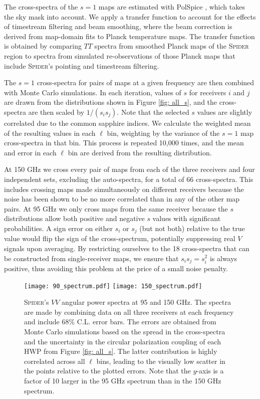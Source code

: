 \documentclass[twocolumn]{aastex61}
\begin{document}
The cross-spectra of the $s=1$ maps are estimated with PolSpice \citep{PolSpice}, which takes the sky mask into account.  We apply a transfer function to account for the effects of timestream filtering and beam smoothing, where the beam correction is derived from map-domain fits to Planck temperature maps.  The transfer function is obtained by comparing $TT$ spectra from smoothed Planck maps of the \textsc{Spider} region to spectra from simulated re-observations of those Planck maps that include \textsc{Spider}'s pointing and timestream filtering.  

The $s=1$ cross-spectra for pairs of maps at a given frequency are then combined with Monte Carlo simulations.  In each iteration, values of $s$ for receivers $i$ and $j$ are drawn from the distributions shown in Figure \ref{fig: all_s}, and the cross-spectra are then scaled by $1/(s_i s_j)$.  Note that the selected $s$ values are slightly correlated due to the common sapphire indices.  We calculate the weighted mean of the resulting values in each $\ell$ bin, weighting by the variance of the $s=1$ map cross-spectra in that bin.  This process is repeated 10,000 times, and the mean and error in each $\ell$ bin are derived from the resulting distribution.

At 150 GHz we cross every pair of maps from each of the three receivers and four independent sets, excluding the auto-spectra, for a total of 66 cross-spectra.  This includes crossing maps made simultaneously on different receivers because the noise has been shown to be no more correlated than in any of the other map pairs.  At 95 GHz we only cross maps from the same receiver because the $s$ distributions allow both positive and negative $s$ values with significant probabilities.  A sign error on either $s_i$ or $s_j$ (but not both) relative to the true value would flip the sign of the cross-spectrum, potentially suppressing real $V$ signals upon averaging.  By restricting ourselves to the 18 cross-spectra that can be constructed from single-receiver maps, we ensure that $s_{i}s_{j}=s_{i}^2$ is always positive, thus avoiding this problem at the price of a small noise penalty.

\begin{figure*}
\begin{centering}
\texttt{[image: 90\_spectrum.pdf]}
\texttt{[image: 150\_spectrum.pdf]}
\par
\end{centering}

\caption{\textsc{Spider}'s $VV$ angular power spectra at 95 and 150 GHz.  The spectra are made by combining data on all three receivers at each frequency and include 68\% C.L. error bars.  The errors are obtained from Monte Carlo simulations based on the spread in the cross-spectra and the uncertainty in the circular polarization coupling of each HWP from Figure \ref{fig: all_s}.  The latter contribution is highly correlated across all $\ell$ bins, leading to the visually low scatter in the points relative to the plotted errors.  Note that the $y$-axis is a factor of 10 larger in the 95 GHz spectrum than in the 150 GHz spectrum.} 
\label{fig: V_spectra}
\end{figure*}
\end{document}
